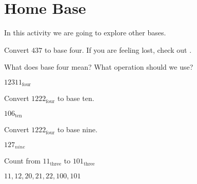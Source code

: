 \documentclass{ximera}
\begin{document}
\section{Home Base}
In this activity we are going to explore other bases. 


\begin{question}
  Convert $437$ to base four. If you are feeling lost, check out
  .
  \begin{answer}
    \begin{hint}
      What does base four mean?
      \pause
      What operation should we use?
    \end{hint}
  $12311_{\text{four}}$ %
  \end{answer}
\end{question}

\begin{rotate}
  \begin{question}
    Convert $1222_{\text{four}}$ to base ten.
    \begin{answer}
      $106_{\text{ten}}$ %
    \end{answer}
  \end{question}

  \begin{question}
    Convert $1222_{\text{four}}$ to base nine.
    \begin{answer}
      $127_{nine}$ %
    \end{answer}
  \end{question}
\end{rotate}

\begin{question}
  Count from $11_\text{three}$ to $101_\text{three}$
  \begin{answer}
    $11, 12, 20, 21, 22, 100, 101$ %
  \end{answer}
\end{question}
\end{document}

